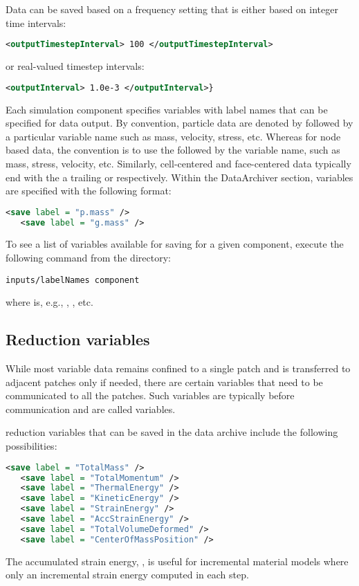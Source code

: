 Data can be saved based on a frequency setting that is either based on integer time
intervals:
\begin{lstlisting}[language=XML]
  <outputTimestepInterval> 100 </outputTimestepInterval>
\end{lstlisting}
or real-valued timestep intervals:
\begin{lstlisting}[language=XML]
  <outputInterval> 1.0e-3 </outputInterval>}
\end{lstlisting}

Each simulation component specifies variables with label names that
can be specified for data output.  By convention, particle data are
denoted by  followed by a particular variable name
such as mass, velocity, stress, etc.  Whereas for node based data, the
convention is to use the  followed by the variable
name, such as mass, stress, velocity, etc.  Similarly, cell-centered
and face-centered data typically end with the a trailing 
or   respectively.  Within the DataArchiver
section, variables are specified with the following format:

\begin{lstlisting}[language=XML]
   <save label = "p.mass" />
   <save label = "g.mass" />
\end{lstlisting}

To see a list of
variables available for saving for a given component, execute the following
command from the  directory:

\begin{lstlisting}[backgroundcolor=\color{background}]
inputs/labelNames component
\end{lstlisting}
where  is, e.g., , , etc.

\subsection{Reduction variables}
While most variable data remains confined to a single patch and is transferred
to adjacent patches only if needed, there are certain variables that need to
be communicated to all the patches.  Such variables are typically 
before communication and are called  variables.

\MPM reduction variables that can be saved in the data archive include the 
following possibilities:
\begin{lstlisting}[language=XML]
   <save label = "TotalMass" />
   <save label = "TotalMomentum" />
   <save label = "ThermalEnergy" />
   <save label = "KineticEnergy" />
   <save label = "StrainEnergy" />
   <save label = "AccStrainEnergy" />
   <save label = "TotalVolumeDeformed" />
   <save label = "CenterOfMassPosition" />
\end{lstlisting}
The accumulated strain energy, , is useful for incremental
material models where only an incremental strain energy computed in each step.

